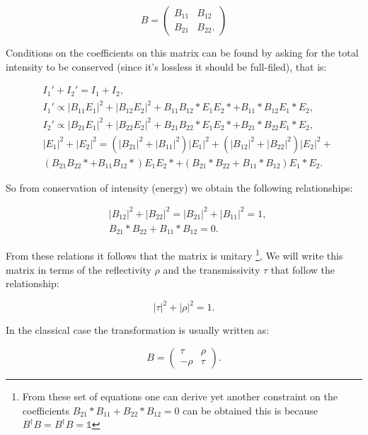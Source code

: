 \documentclass[11pt]{article}
\begin{document}
\begin{equation}
B=\begin{pmatrix} B_{11}& B_{12} \\B_{21} & B_{22}. \end{pmatrix}
\end{equation}

Conditions on the coefficients on this matrix can be found by asking for the total intensity to be conserved (since it's lossless it should be full-filed), that is:

\begin{align}
&I_{1}'+I_{2}'=I_{1}+I_{2}, \\
&I_{1}'\propto|B_{11} E_{1}|^{2}+|B_{12} E_{2}|^{2}+B_{11} B_{12}* E_{1} E_{2}*+B_{11}* B_{12} E_{1}* E_{2}, \\
&I_{2}'\propto|B_{21} E_{1}|^{2}+|B_{22} E_{2}|^{2}+B_{21} B_{22}* E_{1} E_{2}*+B_{21}* B_{22} E_{1}* E_{2},\\
&|E_{1}|^{2}+|E_{2}|^{2}=(|B_{21}|^{2}+|B_{11}|^{2})|E_{1}|^{2}+(|B_{12}|^{2}+|B_{22}|^{2})|E_{2}|^{2}+\\
&(B_{21} B_{22}*+B_{11} B_{12}*)E_{1} E_{2}*+(B_{21}* B_{22}+B_{11}* B_{12})E_{1}* E_{2}.
\end{align}

So from conservation of intensity (energy) we obtain the following relationships:

\begin{align}
&|B_{12}|^{2}+|B_{22}|^{2}=|B_{21}|^{2}+|B_{11}|^{2}=1,\\
&B_{21}* B_{22}+B_{11}* B_{12}=0.
\end{align}

From these relations it follows that the matrix is unitary \footnote{From these set of equations one can derive yet another constraint on the coefficients $B_{21}* B_{11}+B_{22}* B_{12}=0$ can be obtained this is because $B^{\dagger}B=B^{\dagger}B=\mathbb{1}$}, We will write this matrix in terms of the reflectivity $\rho$ and the transmissivity $\tau$ that follow the relationship:

\begin{equation}
|\tau|^{2}+|\rho|^{2}=1.
\end{equation}
  
 In the classical case the transformation is usually written as:
 
 \begin{equation}
 B=\begin{pmatrix} \tau & \rho \\ -\rho & \tau \end{pmatrix}.
 \end{equation} 
\end{document}
